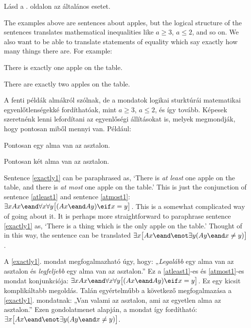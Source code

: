 Lásd a \pageref{summary.atmost}. oldalon az általános esetet.

The examples above are sentences about apples, but the logical structure of the sentences translates mathematical inequalities like $a\geq 3$, $a \leq 2$, and so on. We also want to be able to translate statements of equality which say exactly how many things there are. For example:
\begin{earg}
\item[\ex{exactly1}] There is exactly one apple on the table.
\item[\ex{exactly2}] There are exactly two apples on the table.
\end{earg}

A fenti példák almákról szólnak, de a mondatok logikai sturktúrái matematikai egyenlőtlenségekké fordíthatóak, mint $a\geqslant 3$, $a \leqslant 2$, és így tovább. Képesek szeretnénk lenni lefordítani az egyenlőségi állításokat is, melyek megmondják, hogy pontosan miből mennyi van. Például:
\begin{earg}
\item[\ex{exactly1}] Pontosan egy alma van az asztalon.
\item[\ex{exactly2}] Pontosan két alma van az asztalon.
\end{earg}

Sentence \ref{exactly1} can be paraphrased as, `There is \emph{at least} one apple on the table, and there is \emph{at most} one apple on the table.' This is just the conjunction of sentence \ref{atleast1} and sentence \ref{atmost1}: $\exists x Ax \eand \forall x\forall y\bigl[(Ax \eand Ay) \eif x=y\bigr]$. This is a somewhat complicated way of going about it. It is perhaps more straightforward to paraphrase sentence \ref{exactly1} as, `There is a thing which is the only apple on the table.' Thought of in this way, the sentence can be translated $\exists x\bigl[Ax \eand \enot\exists y(Ay \eand x\neq y)\bigr]$.

A \ref{exactly1}. mondat megfogalmazható úgy, hogy: „\emph{Legalább} egy alma van az asztalon és \emph{legfeljebb} egy alma van az asztalon.” Ez a \ref{atleast1}-es és \ref{atmost1}-es mondat konjunkciója: $\exists x Ax \eand \forall x\forall y\bigl[(Ax \eand Ay) \eif x=y\bigr]$. Ez egy kicsit komplikáltabb megoldás. Talán egyértelműbb a következő megfogalmazása a \ref{exactly1}. mondatnak: „Van valami az asztalon, ami az egyetlen alma az asztalon.” Ezen gondolatmenet alapján, a mondat így fordítható: $\exists x\bigl[Ax \eand \enot\exists y(Ay \eand x\neq y)\bigr]$.

